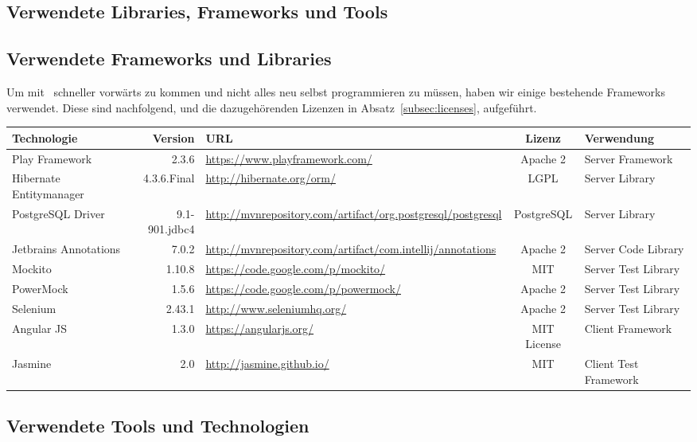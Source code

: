 \begin{landscape}
	\section{Verwendete Libraries, Frameworks und Tools}

	\subsection{Verwendete Frameworks und Libraries}		
	Um mit \eeppi\ schneller vorwärts zu kommen und nicht alles neu selbst programmieren zu müssen,
	haben wir einige bestehende Frameworks verwendet.
	Diese sind nachfolgend, und die dazugehörenden Lizenzen in Absatz\ \ref{subsec:licenses}, aufgeführt.
	
	
	\vspace{0.5cm}
	
	\newcommand{\addLib}[5]{
		#1 & #2 & \url{#3} & #4 & #5 \\ \hline
	}
	
	
	\begin{tabularx}{\linewidth}{| l r | X | c | l |}
		\hline
		\textbf{Technologie} & \textbf{Version} & \textbf{URL} & \textbf{Lizenz} & \textbf{Verwendung} \\
		\hline \hline
		\addLib{Play Framework}{2.3.6}{https://www.playframework.com/}{Apache 2}{Server Framework}
		\addLib{Hibernate Entitymanager}{4.3.6.Final}{http://hibernate.org/orm/}{LGPL}{Server Library}
		\addLib{PostgreSQL Driver}{9.1-901.jdbc4}{http://mvnrepository.com/artifact/org.postgresql/postgresql}{PostgreSQL}{Server Library}
		\addLib{Jetbrains Annotations}{7.0.2}{http://mvnrepository.com/artifact/com.intellij/annotations}{Apache 2}{Server Code Library}
		\addLib{Mockito}{1.10.8}{https://code.google.com/p/mockito/}{MIT}{Server Test Library}
		\addLib{PowerMock}{1.5.6}{https://code.google.com/p/powermock/}{Apache 2}{Server Test Library}
		\addLib{Selenium}{2.43.1}{http://www.seleniumhq.org/}{Apache 2}{Server Test Library}
		\addLib{Angular JS}{1.3.0}{https://angularjs.org/}{MIT License}{Client Framework}
		\addLib{Jasmine}{2.0}{http://jasmine.github.io/}{MIT}{Client Test Framework}
	\end{tabularx}

		\subsection{Verwendete Tools und Technologien}
		

\end{landscape}
